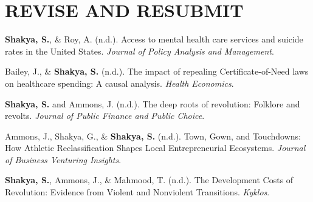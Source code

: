 \section*{REVISE AND RESUBMIT}
\begin{etaremune}
\item \textbf{Shakya, S.}, \& Roy, A. (n.d.). Access to mental health care services and suicide rates in the United States. \textit{Journal of Policy Analysis and Management}.
\item Bailey, J., \& \textbf{Shakya, S.} (n.d.). The impact of repealing Certificate-of-Need laws on healthcare spending: A causal analysis. \textit{Health Economics}.
\item \textbf{Shakya, S.} and Ammons, J. (n.d.). The deep roots of revolution: Folklore and revolts. \textit{Journal of Public Finance and Public Choice}.
\item Ammons, J., Shakya, G., \& \textbf{Shakya, S.} (n.d.). Town, Gown, and Touchdowns: How Athletic Reclassification Shapes Local Entrepreneurial Ecosystems. \textit{Journal of Business Venturing Insights}.
\item \textbf{Shakya, S.}, Ammons, J., \& Mahmood, T. (n.d.). The Development Costs of Revolution: Evidence from Violent and Nonviolent Transitions. \textit{Kyklos}.
\end{etaremune}

